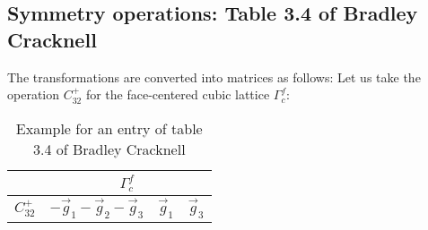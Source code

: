 \documentclass[11pt,a4paper]{report}
\begin{document}

\subsection{Symmetry operations: Table 3.4 of Bradley Cracknell}
The transformations are converted into matrices as follows: Let us
take the operation $C^+_{32}$ for the face-centered cubic lattice
$\Gamma^f_c$:
\begin{table}[h!]
\begin{center}
\begin{tabular}{|l|c|c|c|}
\hline
&\multicolumn{3}{|c|}{$\Gamma^f_c$}\\
\hline
$C^+_{32}$ & $-\vec{g}_1-\vec{g}_2-\vec{g}_3$ & $\vec{g}_1$ & $\vec{g}_3$\\
\hline
\end{tabular}
\end{center}
\caption{\label{tab:explanationbradleytable34} Example for an entry of
  table 3.4 of Bradley Cracknell\cite{bradley72_book}}
\end{table}
\end{document}
